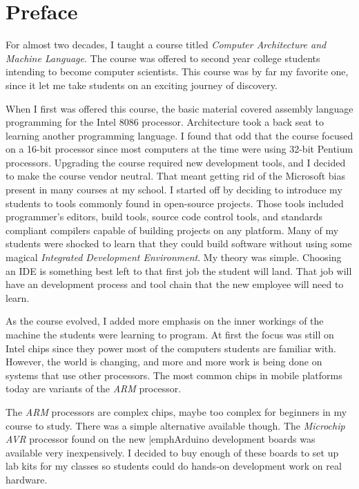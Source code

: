 \chapter{Preface}

For almost two decades, I taught a course titled \emph{Computer Architecture
and Machine Language}. The course was offered to second year college students
intending to become computer scientists. This course was by far my favorite
one, since it let me take students on an exciting journey of discovery.

When I first was offered this course, the basic material covered assembly
language programming for the Intel 8086 processor. Architecture took a back
seat to learning another programming language. I found that odd that the course
focused on a 16-bit processor since most computers at the time were using
32-bit Pentium processors. Upgrading the course required new development tools,
and I decided to make the course vendor neutral. That meant getting rid of the
Microsoft bias present in many courses at my school. I started off by deciding
to introduce my students to tools commonly found in open-source projects. Those
tools included programmer's editors, build tools, source code control tools,
and standards compliant compilers capable of building projects on any platform.
Many of my students were shocked to learn that they could build software
without using some magical \emph{Integrated Development Environment}. My theory
was simple. Choosing an IDE is something best left to that first job the
student will land. That job will have an development process and tool chain
that the new employee will need to learn. 

As the course evolved, I added more emphasis on the inner workings of the
machine the students were learning to program. At first the focus was still on
Intel chips since they power most of the computers students are familiar with.
However, the world is changing, and more and more work is being done on systems
that use other processors. The most common chips in mobile platforms today are
variants of the \emph{ARM} processor. 

The \emph{ARM} processors are complex chips, maybe too complex for beginners in
my course to study. There was a simple alternative available though. The
\emph{Microchip AVR} processor found on the new |emph{Arduino} development
boards was available very inexpensively. I decided to buy enough of these
boards to set up lab kits for my classes so students could do hands-on
development work on real hardware.

